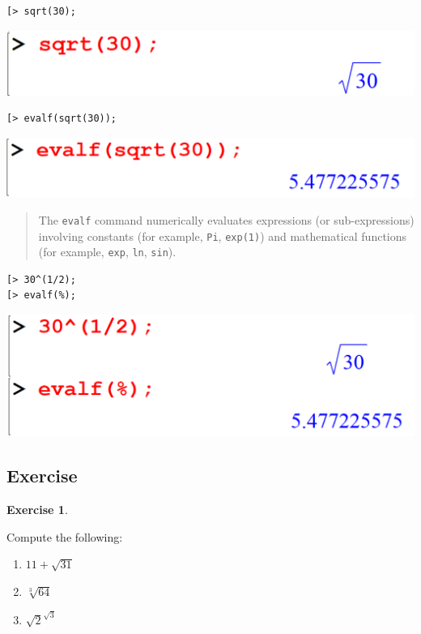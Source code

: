 \documentclass[
]{book}
\providecommand{\tightlist}{%
  \setlength{\itemsep}{0pt}\setlength{\parskip}{0pt}}
\theoremstyle{definition}
\theoremstyle{definition}
\theoremstyle{definition}
\newtheorem{exercise}{Exercise}[chapter]
\theoremstyle{definition}
\theoremstyle{remark}
\begin{document}
\begin{verbatim}
[> sqrt(30);
\end{verbatim}

\includegraphics{figures/Lesson 1/fig28.png}

\begin{verbatim}
[> evalf(sqrt(30));
\end{verbatim}

\includegraphics{figures/Lesson 1/fig29.png}

\begin{quote}
The \texttt{evalf} command numerically evaluates expressions (or sub-expressions) involving constants (for example, \texttt{Pi}, \texttt{exp(1)}) and mathematical functions (for example, \texttt{exp}, \texttt{ln}, \texttt{sin}).
\end{quote}

\begin{verbatim}
[> 30^(1/2);
[> evalf(%);
\end{verbatim}

\includegraphics{figures/Lesson 1/fig30.png}

\subsection{Exercise}\label{exercise}

\begin{exercise}
\protect\hypertarget{exr:unnamed-chunk-4}{}\label{exr:unnamed-chunk-4}

Compute the following:

\begin{enumerate}
\def\labelenumi{\roman{enumi}.}
\tightlist
\item
  \(11 + \sqrt{31}\)
\item
  \(\sqrt[3]{64}\)
\item
  \(\sqrt{2}^{\sqrt{3}}\)
\end{enumerate}

\end{exercise}
\end{document}
